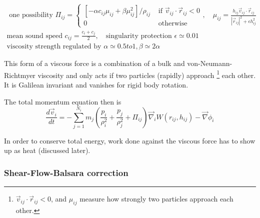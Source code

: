 \begin{equation}
    \begin{gathered}
        \text { one possibility } \Pi_{i j}=\left\{\begin{array}{cc}
            {\left[-\alpha c_{i j} \mu_{i j}+\beta \mu_{i j}^2\right] / \rho_{i j}} & \text { if } \vec{v}_{i j} \cdot \vec{r}_{i j}<0 \\
            0 & \text { otherwise }
            \end{array}, \quad \mu_{i j}=\frac{h_{i j} \vec{v}_{i j} \cdot \vec{r}_{i j}}{\left|\vec{r}_{i j}\right|^2+\epsilon h_{i j}^2}\right. \\
        \text{mean sound speed } c_{ij} = \frac{c_i + c_j}{2}, \quad \text{singularity protection } \epsilon \simeq 0.01 \\
        \text{viscosity strength regulated by } \alpha \simeq 0.5 to 1, \beta \simeq 2 \alpha
    \end{gathered}
\end{equation}

This form of a viscous force is a combination of a bulk and von-Neumann-Richtmyer viscosity and only acts if two particles (rapidly) approach \footnote{$\vec{v}_{i j} \cdot \vec{r}_{i j}<0$, and $\mu_{ij}$ measure how strongly two particles approach each other.} each other. It is Galilean invariant and vanishes for rigid body rotation.

\begin{mdframed}[style = padded]
    The total momentum equation then is
    \begin{equation}
        \frac{d \vec{v}_i}{d t}=-\sum_{j=1}^{N_i} m_j\left(\frac{p_i}{\rho_i^2}+\frac{p_j}{\rho_j^2}+\Pi_{i j}\right) \vec{\nabla}_i W\left(r_{i j}, h_{i j}\right)-\vec{\nabla} \phi_i
    \end{equation}
\end{mdframed}


In order to conserve total energy, work done against the viscous force has to show up as heat (discussed later).

\subsubsection{Shear-Flow-Balsara correction}

